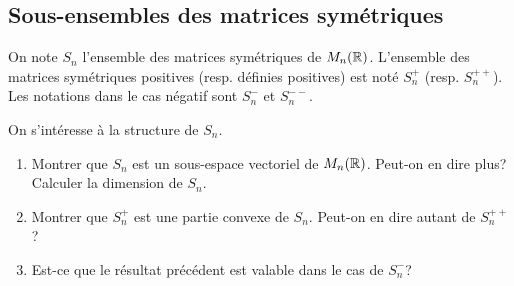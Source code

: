 \documentclass[11pt, a4paper]{article}
\begin{document}
\subsection{Sous-ensembles des matrices symétriques}
\label{sec:symmatrices}

On note $S_n$ l'ensemble des matrices symétriques de
$M_n(\mathbb{R})$. L'ensemble des matrices symétriques positives
(resp. définies positives) est noté $S_n^+$ (resp. $S_n^{++}$). Les
notations dans le cas négatif sont $S_n^{-}$ et $S_n^{--}$.

\begin{question}
  On s'intéresse à la structure de $S_n$.
  \begin{enumerate}
  \item Montrer que $S_n$ est un sous-espace vectoriel de
    $M_n(\mathbb{R})$. Peut-on en dire plus? Calculer la dimension de $S_n$.
  \item Montrer que $S_n^{+}$ est une partie convexe de
    $S_n$. Peut-on en dire autant de $S_n^{++}$?
  \item Est-ce que le résultat précédent est valable dans le cas de
    $S_n^{-}$?
  \end{enumerate}
\end{question}
\end{document}
